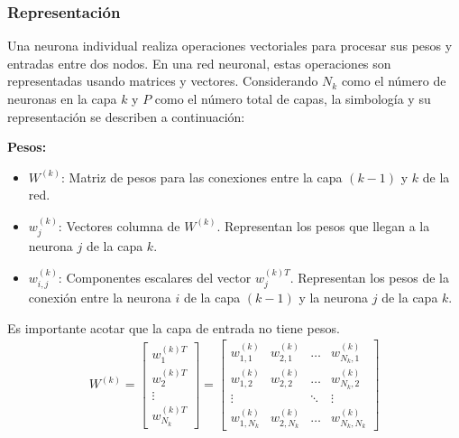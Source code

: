 \subsubsection{Representación}

Una neurona individual realiza operaciones vectoriales para procesar sus pesos y entradas entre dos nodos. En una red neuronal, estas operaciones son representadas usando matrices y vectores. Considerando $N_k$ como el número de neuronas en la capa $k$ y $P$ como el número total de capas, la simbología y su representación se describen a continuación:

\textbf{Pesos:}
\begin{itemize}
    \item $W^{(k)}$: Matriz de pesos para las conexiones entre la capa $(k-1)$ y $k$ de la red.
    \item $w_{j}^{(k)}$: Vectores columna de $W^{(k)}$. Representan los pesos que llegan a la neurona $j$ de la capa $k$. 
    \item $w_{i,j}^{(k)}$: Componentes escalares del vector $w_{j}^{(k)T}$. Representan los pesos de la conexión entre la neurona $i$ de la capa $(k-1)$ y la neurona $j$ de la capa $k$.
\end{itemize} 
%
Es importante acotar que la capa de entrada no tiene pesos.
%
\begin{align*}
    W^{(k)} = \begin{bmatrix} 
                w_{1}^{(k)T} \\ 
                w_{2}^{(k)T} \\ 
                \vdots \\ 
                w_{N_k}^{(k)T} 
              \end{bmatrix} 
            = \begin{bmatrix} 
                w_{1,1}^{(k)} & w_{2,1}^{(k)} & \dots & w_{N_k,1}^{(k)} \\
                w_{1,2}^{(k)} & w_{2,2}^{(k)} & \dots & w_{N_k,2}^{(k)} \\
                \vdots & & \ddots & \vdots \\
                w_{1,N_k}^{(k)} & w_{2,N_k}^{(k)} & \dots & w_{N_k,N_k}^{(k)}
              \end{bmatrix}
\end{align*}

